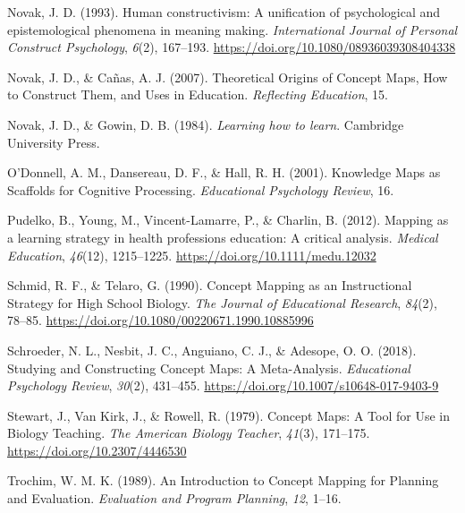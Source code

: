 \documentclass[
  letterpaper,
  DIV=11,
  numbers=noendperiod]{scrartcl}
\newlength{\cslhangindent}
\newlength{\cslentryspacingunit} %
\newenvironment{CSLReferences}[2] %
 {%
  \setlength{\parindent}{0pt}
  \ifodd #1
  \let\oldpar\par
  \def\par{\hangindent=\cslhangindent\oldpar}
  \fi
  \setlength{\parskip}{#2\cslentryspacingunit}
 }%
 {}
\begin{document}
\begin{CSLReferences}{1}{0}
\leavevmode{}%
Novak, J. D. (1993). Human constructivism: {A} unification of
psychological and epistemological phenomena in meaning making.
\emph{International Journal of Personal Construct Psychology},
\emph{6}(2), 167--193. \url{https://doi.org/10.1080/08936039308404338}

\leavevmode{}%
Novak, J. D., \& Cañas, A. J. (2007). Theoretical {Origins} of {Concept
Maps}, {How} to {Construct Them}, and {Uses} in {Education}.
\emph{Reflecting Education}, 15.

\leavevmode{}%
Novak, J. D., \& Gowin, D. B. (1984). \emph{Learning how to learn}.
{Cambridge University Press}.

\leavevmode{}%
O'Donnell, A. M., Dansereau, D. F., \& Hall, R. H. (2001). Knowledge
{Maps} as {Scaffolds} for {Cognitive Processing}. \emph{Educational
Psychology Review}, 16.

\leavevmode{}%
Pudelko, B., Young, M., Vincent-Lamarre, P., \& Charlin, B. (2012).
Mapping as a learning strategy in health professions education: A
critical analysis. \emph{Medical Education}, \emph{46}(12), 1215--1225.
\url{https://doi.org/10.1111/medu.12032}

\leavevmode{}%
Schmid, R. F., \& Telaro, G. (1990). Concept {Mapping} as an
{Instructional Strategy} for {High School Biology}. \emph{The Journal of
Educational Research}, \emph{84}(2), 78--85.
\url{https://doi.org/10.1080/00220671.1990.10885996}

\leavevmode{}%
Schroeder, N. L., Nesbit, J. C., Anguiano, C. J., \& Adesope, O. O.
(2018). Studying and {Constructing Concept Maps}: A {Meta-Analysis}.
\emph{Educational Psychology Review}, \emph{30}(2), 431--455.
\url{https://doi.org/10.1007/s10648-017-9403-9}

\leavevmode{}%
Stewart, J., Van Kirk, J., \& Rowell, R. (1979). Concept {Maps}: {A
Tool} for {Use} in {Biology Teaching}. \emph{The American Biology
Teacher}, \emph{41}(3), 171--175. \url{https://doi.org/10.2307/4446530}

\leavevmode{}%
Trochim, W. M. K. (1989). An {Introduction} to {Concept Mapping} for
{Planning} and {Evaluation}. \emph{Evaluation and Program Planning},
\emph{12}, 1--16.


\end{CSLReferences}
\end{document}

